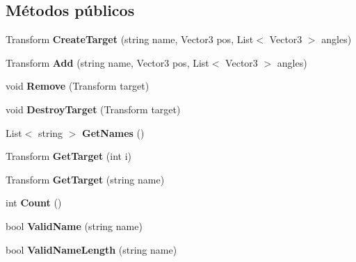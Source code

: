 \subsection*{Métodos públicos}
\begin{DoxyCompactItemize}
\item 
\mbox{\label{class_target_control_a87c7dc05ecebaef86c6d6be9d8daaa0c}} 
Transform {\bfseries Create\+Target} (string name, Vector3 pos, List$<$ Vector3 $>$ angles)
\item 
\mbox{\label{class_target_control_a5e5fc43fd995ec2863ad896a301fd3c2}} 
Transform {\bfseries Add} (string name, Vector3 pos, List$<$ Vector3 $>$ angles)
\item 
\mbox{\label{class_target_control_a118416e825413adb6c4c60ac7b08ff69}} 
void {\bfseries Remove} (Transform target)
\item 
\mbox{\label{class_target_control_a728aecb12c800b1989977044e22264bb}} 
void {\bfseries Destroy\+Target} (Transform target)
\item 
\mbox{\label{class_target_control_a0a09ff530caea4a96bbcfe88bd63f238}} 
List$<$ string $>$ {\bfseries Get\+Names} ()
\item 
\mbox{\label{class_target_control_a86dcdb984de7099a9db940312a2aa541}} 
Transform {\bfseries Get\+Target} (int i)
\item 
\mbox{\label{class_target_control_ac0274d2169116589048ea53988cdbc34}} 
Transform {\bfseries Get\+Target} (string name)
\item 
\mbox{\label{class_target_control_a7a5424ff72566de173d0cd19295b2532}} 
int {\bfseries Count} ()
\item 
\mbox{\label{class_target_control_a6fc8e97f10a1270357d483e629c0a899}} 
bool {\bfseries Valid\+Name} (string name)
\item 
\mbox{\label{class_target_control_a87d8a6a4fdf71334afd9e5d5c6204f90}} 
bool {\bfseries Valid\+Name\+Length} (string name)
\end{DoxyCompactItemize}


